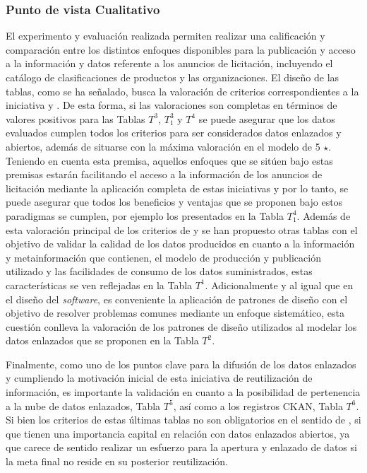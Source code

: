 \subsubsection{Punto de vista Cualitativo}
El experimento y evaluación realizada permiten realizar una calificación y comparación entre los distintos enfoques 
disponibles para la publicación y acceso a la información y datos referente a los anuncios de licitación, incluyendo
el catálogo de clasificaciones de productos y las organizaciones. El diseño de las tablas, como se ha señalado, busca 
la valoración de criterios correspondientes a la iniciativa \linkeddata y \opendata. De esta forma, si las valoraciones 
son completas en términos de valores positivos para las Tablas $T^{3}$, $T^{3}_1$ y $T^{4}$ se puede asegurar 
que los datos evaluados cumplen todos los criterios para ser considerados datos enlazados y abiertos, además 
de situarse con la máxima valoración en el modelo de 5 $\star$. Teniendo en cuenta esta premisa, aquellos 
enfoques que se sitúen bajo estas premisas estarán facilitando el acceso a la información de los anuncios 
de licitación mediante la aplicación completa de estas iniciativas y por lo tanto, se puede asegurar que 
todos los beneficios y ventajas que se proponen bajo estos paradigmas se cumplen, por ejemplo los presentados en la Tabla $T^{4}_1$. Además de esta valoración 
principal de los criterios de \linkeddata y \opendata se han propuesto otras tablas con el objetivo de 
validar la calidad de los datos producidos en cuanto a la información y metainformación que contienen, 
el modelo de producción y publicación utilizado y las facilidades de consumo de los datos suministrados, estas 
características se ven reflejadas en la Tabla $T^{1}$. Adicionalmente y al igual que en el diseño del \textit{software}, 
es conveniente la aplicación de patrones de diseño con el objetivo de resolver problemas comunes mediante un enfoque 
sistemático, esta cuestión conlleva la valoración de los patrones de diseño utilizados al modelar los datos enlazados que 
se proponen en la Tabla $T^{2}$. 

Finalmente, como uno de los puntos clave para la difusión de los datos enlazados y 
cumpliendo la motivación inicial de esta iniciativa de reutilización de información, es importante la validación en 
cuanto a la posibilidad de pertenencia a la nube de datos enlazados, Tabla $T^{5}$, así como a los registros CKAN, Tabla $T^{6}$. Si 
bien los criterios de estas últimas tablas no son obligatorios en el sentido de \linkeddata, si que tienen una importancia 
capital en relación con datos enlazados abiertos, ya que carece de sentido realizar un esfuerzo para la apertura 
y enlazado de datos si la meta final no reside en su posterior reutilización. 

